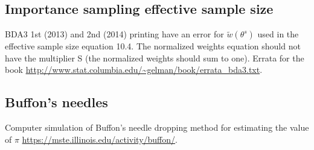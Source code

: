 \documentclass[a4paper,11pt,english]{article}
\begin{document}
 \subsection*{Importance sampling effective sample size}
 
 {\color{red} BDA3 1st (2013) and 2nd (2014) printing have an error
   for $\tilde{w}(\theta^s)$ used in the effective sample size
   equation 10.4. The normalized weights equation should not have the
   multiplier S (the normalized weights should sum to one). Errata for
   the book
   \url{http://www.stat.columbia.edu/~gelman/book/errata_bda3.txt}.}
 
 \subsection*{Buffon's needles}

 Computer simulation of Buffon's needle dropping method for estimating
 the value of $\pi$ \url{https://mste.illinois.edu/activity/buffon/}. 

 
\end{document}
